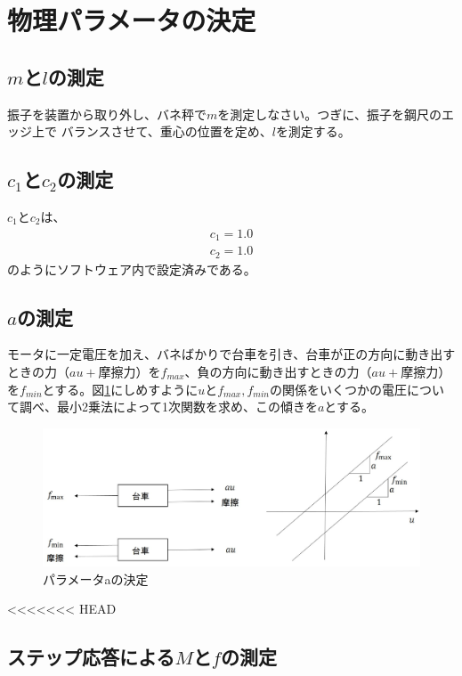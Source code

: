 \documentclass[a4j,11pt,twoside]{ujbook}
\begin{document}
\section{物理パラメータの決定}
	\subsection{$m$と$l$の測定}
	振子を装置から取り外し、バネ秤で$m$を測定しなさい。つぎに、振子を鋼尺のエッジ上で
	バランスさせて、重心の位置を定め、$l$を測定する。

	\subsection{$c_1$と$c_2$の測定}
	$c_1$と$c_2$は、
	\begin{eqnarray*}
		c_1 = 1.0\\
		c_2 = 1.0
	\end{eqnarray*}
	のようにソフトウェア内で設定済みである。

	\subsection{$a$の測定}
	モータに一定電圧を加え、バネばかりで台車を引き、台車が正の方向に動き出すときの力（$au+摩擦力$）を$f_{max}$、負の方向に動き出すときの力（$au+摩擦力$）を$f_{min}$とする。図\ref{fig:パラメータaの決定}にしめすように$u$と$f_{max},f_{min}$の関係をいくつかの電圧について調べ、最小2乗法によって1次関数を求め、この傾きを$a$とする。


	\begin{figure}[htbp]
		\begin{center}
			\includegraphics[width = 0.8 \linewidth]{a.eps}
			\caption{パラメータaの決定}
			\label{fig:パラメータaの決定}
		\end{center}
	\end{figure}
<<<<<<< HEAD

	\subsection{ステップ応答による$M$と$f$の測定}
\end{document}

